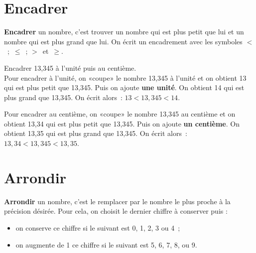 
\section{Encadrer}

\begin{aconnaitre}
\textbf{Encadrer} un nombre, c'est trouver un nombre qui est plus petit que lui et un nombre qui est plus grand que lui. On écrit un encadrement avec les symboles $<$ ; $\leqslant$ ; $>$ et $\geqslant$. 
\end{aconnaitre}

\begin{exemple*1}
Encadrer 13,345 à l'unité puis au centième.\\[1em]
Pour encadrer à l'unité, on «coupe» le nombre 13,345 à l'unité et on obtient 13 qui est plus petit  que 13,345. Puis on ajoute \textbf{une unité}. On obtient 14 qui est plus grand que 13,345. On écrit alors : $13 < 13,345 < 14$.


Pour encadrer au centième, on «coupe» le nombre 13,345 au centième et on obtient 13,34 qui est plus petit que 13,345. Puis on ajoute \textbf{un centième}. On obtient 13,35 qui est plus grand que 13,345. On écrit alors : $13,34 < 13,345 < 13,35$.
\end{exemple*1}


\section{Arrondir}

\begin{aconnaitre}
\textbf{Arrondir} un nombre, c’est le remplacer par le nombre le plus proche à la précision désirée. Pour cela, on choisit le dernier chiffre à conserver puis :
\begin{itemize}
 \item on conserve ce chiffre si le suivant est 0, 1, 2, 3 ou 4 ;
 \item on augmente de 1 ce chiffre si le suivant est 5, 6, 7, 8, ou 9.
 \end{itemize}
\end{aconnaitre}


